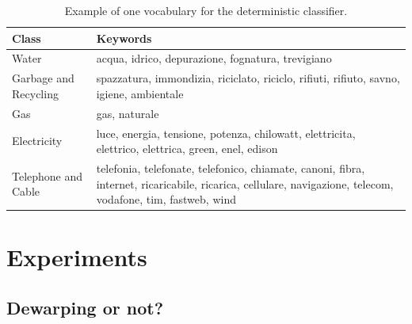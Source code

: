 \documentclass[10pt,twocolumn,letterpaper]{article}
\begin{document}
\bgroup
\def\arraystretch{1.3}%
\begin{table}[!h]
  \begin{center}
    \begin{tabular}{p{2cm} p{5cm}}
      \hline
      Class                 & Keywords                                                                                                                                                    \\ \hline
      Water                 & acqua, idrico, depurazione, fognatura, trevigiano                                                                                                           \\
      Garbage and Recycling & spazzatura, immondizia, riciclato, riciclo, rifiuti, rifiuto, savno, igiene, ambientale                                                                     \\
      Gas                   & gas, naturale                                                                                                                                               \\
      Electricity           & luce, energia, tensione, potenza, chilowatt, elettricita, elettrico, elettrica, green, enel, edison                                                         \\
      Telephone and Cable   & telefonia, telefonate, telefonico, chiamate, canoni, fibra, internet, ricaricabile, ricarica, cellulare, navigazione, telecom, vodafone, tim, fastweb, wind \\ \hline
    \end{tabular}
  \end{center}
  \label{table:determnistic-classifier-dict}
  \caption{Example of one vocabulary for the deterministic classifier.}
\end{table}
\egroup

\section{Experiments}
\label{sec:experiments}

\subsection{Dewarping or not?}
\end{document}
